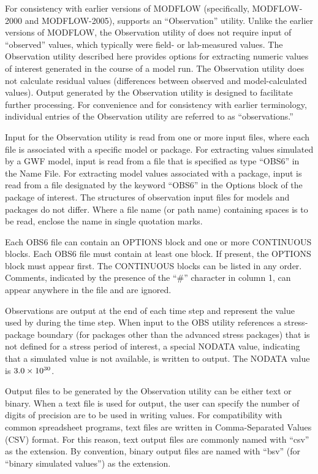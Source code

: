 For consistency with earlier versions of MODFLOW (specifically, MODFLOW-2000 and MODFLOW-2005), \programname{} supports an ``Observation'' utility. Unlike the earlier versions of MODFLOW, the Observation utility of \programname{} does not require input of ``observed'' values, which typically were field- or lab-measured values. The Observation utility described here provides options for extracting numeric values of interest generated in the course of a model run. The Observation utility does not calculate residual values (differences between observed and model-calculated values). Output generated by the Observation utility is designed to facilitate further processing. For convenience and for consistency with earlier terminology, individual entries of the Observation utility are referred to as ``observations.''

Input for the Observation utility is read from one or more input files, where each file is associated with a specific model or package. For extracting values simulated by a GWF model, input is read from a file that is specified as type ``OBS6'' in the Name File. For extracting model values associated with a package, input is read from a file designated by the keyword ``OBS6'' in the Options block of the package of interest. The structures of observation input files for models and packages do not differ. Where a file name (or path name) containing spaces is to be read, enclose the name in single quotation marks.

Each OBS6 file can contain an OPTIONS block and one or more CONTINUOUS blocks. Each OBS6 file must contain at least one block. If present, the OPTIONS block must appear first. The CONTINUOUS blocks can be listed in any order. Comments, indicated by the presence of the ``\#'' character in column 1, can appear anywhere in the file and are ignored. 

Observations are output at the end of each time step and represent the value used by \mf during the time step. When input to the OBS utility references a stress-package boundary (for packages other than the advanced stress packages) that is not defined for a stress period of interest, a special NODATA value, indicating that a simulated value is not available, is written to output. The NODATA value is $3.0 \times 10\textsuperscript{30}$. 

Output files to be generated by the Observation utility can be either text or binary. When a text file is used for output, the user can specify the number of digits of precision are to be used in writing values. For compatibility with common spreadsheet programs, text files are written in Comma-Separated Values (CSV) format. For this reason, text output files are commonly named with ``csv'' as the extension. By convention, binary output files are named with ``bsv'' (for ``binary simulated values'') as the extension.

